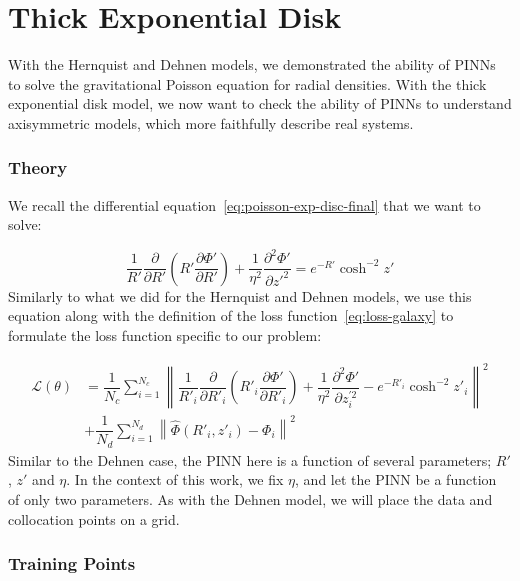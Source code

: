\section{Thick Exponential Disk}\label{sec:disk}

With the Hernquist and Dehnen models, we demonstrated the ability of PINNs to solve the gravitational Poisson equation for radial densities. With the thick exponential disk model, we now want to check the ability of PINNs to understand axisymmetric models, which more faithfully describe real systems.

\subsubsection{Theory}
\par We recall the differential equation~\eqref{eq:poisson-exp-disc-final} that we want to solve:

\begin{equation}
\label{eq:residu-poisson-2}
\dfrac{1}{R'} \dfrac{\partial}{\partial R'} \left(R' \dfrac{\partial \Phi'}{\partial R'}\right) + \dfrac{1}{\eta^{2}}\dfrac{\partial^2 \Phi'}{\partial z'^2} = e^{-R'} \cosh^{-2}{z'}
\end{equation} Similarly to what we did for the Hernquist and Dehnen models, we use this equation along with the definition of the loss function~\eqref{eq:loss-galaxy} to formulate the loss function specific to our problem:

\begin{equation}
    \label{eq:loss-func-hernquist}
    \begin{aligned}
        \mathcal{L}(\theta) &= \dfrac{1}{N_c}\sum^{N_c}_{i=1} \left\|\dfrac{1}{R'_i} \dfrac{\partial}{\partial R'_i} \left(R'_i \dfrac{\partial \Phi'}{\partial R'_i}\right) + \dfrac{1}{\eta^{2}}\dfrac{\partial^2 \Phi'}{\partial z_{i}^{'2}} - e^{-R'_i} \cosh^{-2}{z'_i} \right\|^2 \\
        &+ \dfrac{1}{N_d}\sum^{N_d}_{i=1} \left\|\hat{\Phi}(R'_i, z'_i) - \Phi_i \right\|^2
    \end{aligned}
\end{equation}  Similar to the Dehnen case, the PINN here is a function of several parameters; $R'$, $z'$ and $\eta$. In the context of this work, we fix $\eta$, and let the PINN be a function of only two parameters. As with the Dehnen model, we will place the data and collocation points on a grid.

\subsubsection{Training Points}

